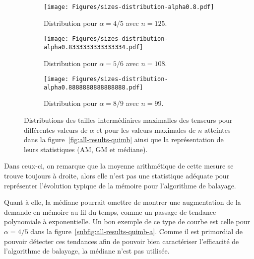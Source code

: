 \begin{figure}[h]
    \centering
    \begin{subfigure}{.49\textwidth}
        \centering
        \texttt{[image: Figures/sizes-distribution-alpha0.8.pdf]}
        \caption{Distribution pour $\alpha = 4/5$ avec $n = 125$.}
        \label{subfig:sizes-distribution-alpha4_5}
    \end{subfigure}
    \hfill
    \begin{subfigure}{.49\textwidth}
        \centering
        \texttt{[image: Figures/sizes-distribution-alpha0.8333333333333334.pdf]}
        \caption{Distribution pour $\alpha = 5/6$ avec $n = 108$.}
        \label{subfig:sizes-distribution-alpha5_6}
    \end{subfigure}
    \medskip
    \vspace{0.1cm}
    \begin{subfigure}{.49\textwidth}
        \centering
        \texttt{[image: Figures/sizes-distribution-alpha0.8888888888888888.pdf]}
        \caption{Distribution pour $\alpha = 8/9$ avec $n = 99$.}
        \label{subfig:sizes-distribution-alpha8_9}
    \end{subfigure}
    \caption[Distributions des tailles intermédiaires maximales des tenseurs pour trois autres valeurs de $\alpha > 3/4$.]{Distributions des tailles intermédiaires maximalles des tenseurs pour différentes valeurs de $\alpha$ et pour les valeurs maximales de $n$ atteintes dans la figure~\ref{fig:all-results-quimb} ainsi que la représentation de leurs statistiques (AM, GM et médiane).}
    \label{fig:sizes-distributions}
\end{figure}
Dans ceux-ci, on remarque que la moyenne arithmétique de cette mesure se trouve toujours à droite, alors elle n'est pas une statistique adéquate pour représenter l'évolution typique de la mémoire pour l'algorithme de balayage.

Quant à elle, la médiane pourrait omettre de montrer une augmentation de la demande en mémoire au fil du temps, comme un passage de tendance polynomiale à exponentielle.
Un bon exemple de ce type de courbe est celle pour $\alpha = 4/5$ dans la figure~\ref{subfig:all-results-quimb-a}.
Comme il est primordial de pouvoir détecter ces tendances afin de pouvoir bien caractériser l'efficacité de l'algorithme de balayage, la médiane n'est pas utilisée.

